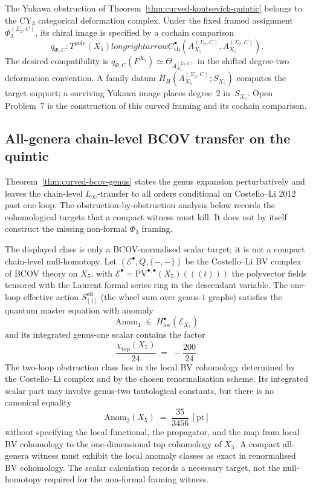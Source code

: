 \begin{remark}
\label{rem:vol1-curved-hochschild}
The Yukawa obstruction of Theorem~\ref{thm:curved-kontsevich-quintic}
belongs to the CY$_3$ categorical deformation complex.  Under the
fixed framed assignment $\Phi_3^{(\Sigma_2,C)}$, its chiral image is
specified by a cochain comparison
\[
 q_{\Phi,C}\colon T^{\mathrm{poly}}(X_5)longrightarrow
 C^\bullet_{\mathrm{ch}}(A_{X_5}^{(\Sigma_2,C)},
 A_{X_5}^{(\Sigma_2,C)}).
\]
The desired compatibility is
$q_{\Phi,C}(F^{X_5})\simeq
\Theta_{A_{X_5}^{(\Sigma_2,C)}}$ in the shifted degree-two
deformation convention.  A family datum
$H_H(A_{X_5}^{(\Sigma_2,C)};S_{X_5})$ computes the target support;
a surviving Yukawa image places degree~$2$ in~$S_{X_5}$.
Open Problem~7 is the construction of this curved framing and its
cochain comparison.
\end{remark}

\subsection{All-genera chain-level BCOV transfer on the quintic}
\label{subsec:all-genera-bcov-transfer}

Theorem~\ref{thm:curved-bcov-genus} states the genus expansion perturbatively and leaves the chain-level $L_\infty$-transfer to all orders conditional on Costello--Li 2012 past one loop. The obstruction-by-obstruction analysis below records the cohomological targets that a compact witness must kill. It does not by itself construct the missing non-formal $\Phi_3$ framing.

\begin{lemma}
\label{lem:two-loop-anomaly-quintic}
The displayed class is only a BCOV-normalised scalar target; it is not a
compact chain-level null-homotopy.
Let $(\mathcal{E}^\bullet, Q, \{-,-\})$ be the Costello--Li BV complex of BCOV theory on $X_5$, with $\mathcal{E}^\bullet = \mathrm{PV}^{\bullet,\bullet}(X_5) ((\!( t )\!))$ the polyvector fields tensored with the Laurent formal series ring in the descendant variable. The one-loop effective action $S^{\mathrm{eff}}_{[1]}$ (the wheel sum over genus-$1$ graphs) satisfies the quantum master equation with anomaly
\[
 \mathrm{Anom}_1
 \;\in\;
 H^\bullet_{\mathrm{loc}}(\mathcal{E}_{X_5})
\]
and its integrated genus-one scalar contains the factor
\[
 \frac{\chi_{\mathrm{top}}(X_5)}{24}
 \;=\;
 -\frac{200}{24}.
\]
The two-loop obstruction class lies in the local BV cohomology determined by the Costello--Li complex and by the chosen renormalisation scheme. Its integrated scalar part may involve genus-two tautological constants, but there is no canonical equality
\[
 \mathrm{Anom}_2(X_5)
 \;=\;
 \frac{35}{3456}\,[\mathrm{pt}]
\]
without specifying the local functional, the propagator, and the map
from local BV cohomology to the one-dimensional top cohomology of
$X_5$. A compact all-genera witness must exhibit the local anomaly
classes as exact in renormalised BV cohomology. The scalar calculation
records a necessary target, not the null-homotopy required for the
non-formal framing witness.
\end{lemma}

